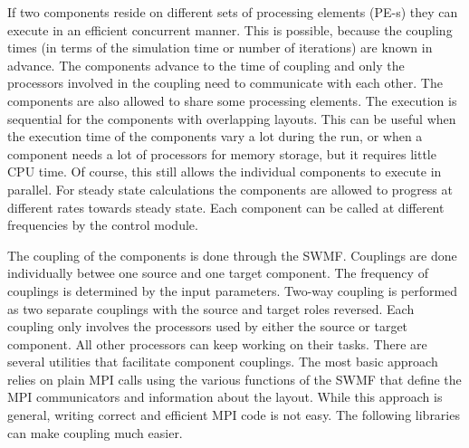 If two components reside on different sets of processing elements
(PE-s) they can execute in an efficient concurrent manner.
This is possible, because the coupling times (in terms of the simulation time
or number of iterations) are known in advance.  
The components advance to the time of coupling and
only the processors involved in the coupling need to communicate with
each other. The components are also allowed to share some processing elements.
The execution is sequential for the components with overlapping layouts.
This can be useful when the execution time of the components vary a lot
during the run, or when a component needs a lot of processors 
for memory storage, but it requires little CPU time.
Of course, this still allows the individual components to execute in parallel.
For steady state calculations the components are allowed to progress
at different rates towards steady state. Each component can be called
at different frequencies by the control module.

The coupling of the components is done through the SWMF. 
Couplings are done individually betwee one source and one target component.
The frequency of couplings is determined by the input parameters.
Two-way coupling is performed as two separate couplings
with the source and target roles reversed.
Each coupling only involves the processors used by either the
source or target component. All other processors can keep working
on their tasks.
There are several utilities that facilitate component couplings. 
The most basic approach relies on plain MPI calls using the various 
functions of the SWMF that define the MPI communicators
and information about the layout. While this approach is general,
writing correct and efficient MPI code is not easy. The following
libraries can make coupling much easier.

